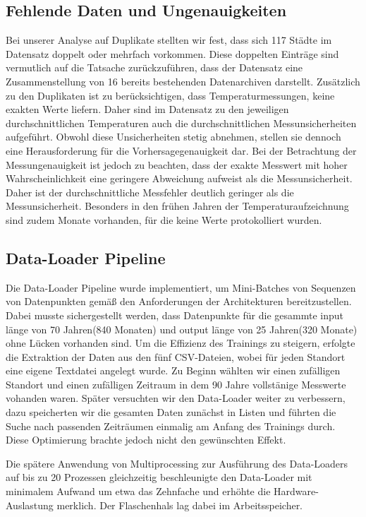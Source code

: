 \documentclass[manuscript,screen,review]{acmart}
\begin{document}
\subsection{Fehlende Daten und Ungenauigkeiten}
Bei unserer Analyse auf Duplikate stellten wir fest, dass sich 117 Städte im Datensatz doppelt oder mehrfach vorkommen. Diese doppelten Einträge sind vermutlich auf die Tatsache zurückzuführen, dass der Datensatz eine Zusammenstellung von 16 bereits bestehenden Datenarchiven darstellt.
Zusätzlich zu den Duplikaten ist zu berücksichtigen, dass Temperaturmessungen, keine exakten Werte liefern. Daher sind im Datensatz zu den jeweiligen durchschnittlichen Temperaturen auch die durchschnittlichen Messunsicherheiten aufgeführt. Obwohl diese Unsicherheiten stetig abnehmen, stellen sie dennoch eine Herausforderung für die Vorhersagegenauigkeit dar. Bei der Betrachtung der Messungenauigkeit ist jedoch zu beachten, dass der exakte Messwert mit hoher Wahrscheinlichkeit eine geringere Abweichung aufweist als die Messunsicherheit. Daher ist der durchschnittliche Messfehler deutlich geringer als die Messunsicherheit.
Besonders in den frühen Jahren der Temperaturaufzeichnung sind zudem Monate vorhanden, für die keine Werte protokolliert wurden.

\subsection{Data-Loader Pipeline}
Die Data-Loader Pipeline wurde implementiert, um Mini-Batches von Sequenzen von Datenpunkten gemäß den Anforderungen der Architekturen bereitzustellen. Dabei musste sichergestellt werden, dass Datenpunkte für die gesammte input länge von 70 Jahren(840 Monaten) und output länge von 25 Jahren(320 Monate) ohne Lücken vorhanden sind.
Um die Effizienz des Trainings zu steigern, erfolgte die Extraktion der Daten aus den fünf CSV-Dateien, wobei für jeden Standort eine eigene Textdatei angelegt wurde. Zu Beginn wählten wir einen zufälligen Standort und einen zufälligen Zeitraum in dem 90 Jahre vollstänige Messwerte vohanden waren.
Später versuchten wir den Data-Loader weiter zu verbessern, dazu speicherten wir die gesamten Daten zunächst in Listen und führten die Suche nach passenden Zeiträumen einmalig am Anfang des Trainings durch. Diese Optimierung brachte jedoch nicht den gewünschten Effekt.

Die spätere Anwendung von Multiprocessing zur Ausführung des Data-Loaders auf bis zu 20 Prozessen gleichzeitig beschleunigte den Data-Loader mit minimalem Aufwand um etwa das Zehnfache und erhöhte die Hardware-Auslastung merklich. Der Flaschenhals lag dabei im Arbeitsspeicher.
\end{document}
